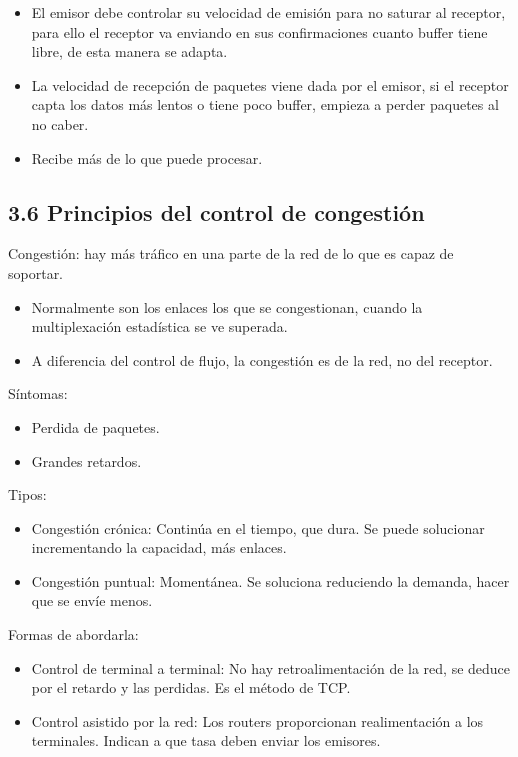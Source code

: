 \documentclass[12pt, twoside, openright]{report} %
\begin{document}
\begin{itemize}
	\item El emisor debe controlar su velocidad de emisión para no saturar
	      al receptor, para ello el receptor va enviando en sus
	      confirmaciones cuanto buffer tiene libre, de esta manera se
	      adapta.
	\item La velocidad de recepción de paquetes viene dada por el emisor, si
	      el receptor capta los datos más lentos o tiene poco buffer, empieza
	      a perder paquetes al no caber.
	\item Recibe más de lo que puede procesar.
\end{itemize}

\subsection{3.6 Principios del control de congestión}

Congestión: hay más tráfico en una parte de la red de lo que es
capaz de soportar.

\begin{itemize}
	\item Normalmente son los enlaces los que se congestionan, cuando la
	      multiplexación estadística se ve superada.
	\item A diferencia del control de flujo, la congestión es de la red, no
	      del receptor.
\end{itemize}

Síntomas:

\begin{itemize}
	\item Perdida de paquetes.
	\item Grandes retardos.
\end{itemize}

Tipos:

\begin{itemize}
	\item Congestión crónica: Continúa en el tiempo, que dura. Se puede
	      solucionar incrementando la capacidad, más enlaces.
	\item Congestión puntual: Momentánea. Se soluciona reduciendo la
	      demanda, hacer que se envíe menos.
\end{itemize}

Formas de abordarla:

\begin{itemize}
	\item Control de terminal a terminal: No hay retroalimentación de la
	      red, se deduce por el retardo y las perdidas. Es el método de TCP.
	\item Control asistido por la red: Los routers proporcionan
	      realimentación a los terminales. Indican a que tasa deben enviar
	      los emisores.
\end{itemize}
\end{document}
